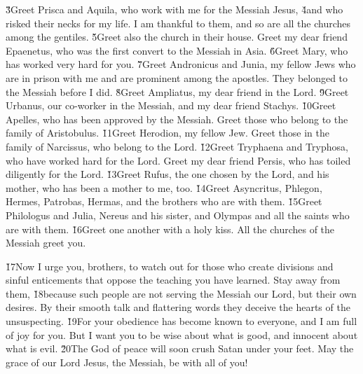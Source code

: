 \v{3}Greet Prisca and Aquila, who work with me for the Messiah Jesus, \v{4}and who risked their necks for my life. I am thankful to them, and so are all the churches among the gentiles. \v{5}Greet also the church in their house. Greet my dear friend Epaenetus, who was the first convert to the Messiah in Asia. \v{6}Greet Mary, who has worked very hard for you. \v{7}Greet Andronicus and Junia, my fellow Jews who are in prison with me and are prominent among the apostles. They belonged to the Messiah before I did. \v{8}Greet Ampliatus, my dear friend in the Lord. \v{9}Greet Urbanus, our co-worker in the Messiah, and my dear friend Stachys. \v{10}Greet Apelles, who has been approved by the Messiah. Greet those who belong to the family of Aristobulus. \v{11}Greet Herodion, my fellow Jew. Greet those in the family of Narcissus, who belong to the Lord. \v{12}Greet Tryphaena and Tryphosa, who have worked hard for the Lord. Greet my dear friend Persis, who has toiled diligently for the Lord. \v{13}Greet Rufus, the one chosen by the Lord, and his mother, who has been a mother to me, too. \v{14}Greet Asyncritus, Phlegon, Hermes, Patrobas, Hermas, and the brothers who are with them. \v{15}Greet Philologus and Julia, Nereus and his sister, and Olympas and all the saints who are with them. \v{16}Greet one another with a holy kiss. All the churches of the Messiah greet you.

\v{17}Now I urge you, brothers, to watch out for those who create divisions and sinful enticements that oppose the teaching you have learned. Stay away from them, \v{18}because such people are not serving the Messiah our Lord, but their own desires. By their smooth talk and flattering words they deceive the hearts of the unsuspecting. \v{19}For your obedience has become known to everyone, and I am full of joy for you. But I want you to be wise about what is good, and innocent about what is evil. \v{20}The God of peace will soon crush Satan under your feet. May the grace of our Lord Jesus, the Messiah, be with all of you!

